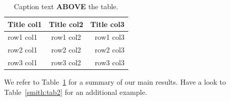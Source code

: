 \documentclass[twoside]{report}
\begin{document}
%
%

%





\begin{table}[!hb]\centering
\caption{\label{smith:tab1} Caption text \textbf{ABOVE} the table.}
\medskip
\begin{tabular}{lcr}
\toprule[0.09 em]
Title col1 & Title col2 & Title col3 \\
\midrule
row1 col1  & row1 col2  & row1 col3  \\
row2 col1  & row2 col2  & row2 col3  \\ %
row3 col1  & row3 col2  & row3 col3  \\
\bottomrule[0.09 em]
\end{tabular}
\end{table}

We refer to Table~\ref{smith:tab1} for a summary of our main results. Have a look to Table~\ref{smith:tab2} for
an additional example.
\end{document}
